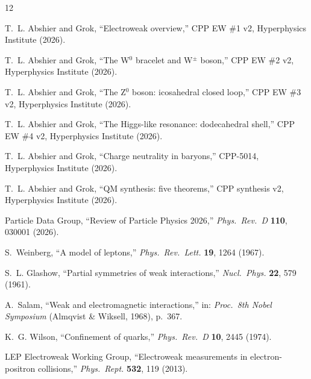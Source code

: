 \documentclass[11pt,a4paper]{article}
\begin{document}

\begin{thebibliography}{12}

T.~L. Abshier and Grok,
``Electroweak overview,''
CPP EW \#1 v2, Hyperphysics Institute (2026).

T.~L. Abshier and Grok,
``The W$^0$ bracelet and W$^\pm$ boson,''
CPP EW \#2 v2, Hyperphysics Institute (2026).

T.~L. Abshier and Grok,
``The Z$^0$ boson: icosahedral closed loop,''
CPP EW \#3 v2, Hyperphysics Institute (2026).

T.~L. Abshier and Grok,
``The Higgs-like resonance: dodecahedral shell,''
CPP EW \#4 v2, Hyperphysics Institute (2026).

T.~L. Abshier and Grok,
``Charge neutrality in baryons,''
CPP-5014, Hyperphysics Institute (2026).

T.~L. Abshier and Grok,
``QM synthesis: five theorems,''
CPP synthesis v2, Hyperphysics Institute (2026).

Particle Data Group,
``Review of Particle Physics 2026,''
\textit{Phys.\ Rev.\ D} \textbf{110}, 030001 (2026).

S.~Weinberg,
``A model of leptons,''
\textit{Phys.\ Rev.\ Lett.} \textbf{19}, 1264 (1967).

S.~L. Glashow,
``Partial symmetries of weak interactions,''
\textit{Nucl.\ Phys.} \textbf{22}, 579 (1961).

A.~Salam,
``Weak and electromagnetic interactions,''
in: \textit{Proc.\ 8th Nobel Symposium} (Almqvist \& Wiksell, 1968), p.~367.

K.~G. Wilson,
``Confinement of quarks,''
\textit{Phys.\ Rev.\ D} \textbf{10}, 2445 (1974).

LEP Electroweak Working Group,
``Electroweak measurements in electron-positron collisions,''
\textit{Phys.\ Rept.} \textbf{532}, 119 (2013).

\end{thebibliography}
\end{document}
